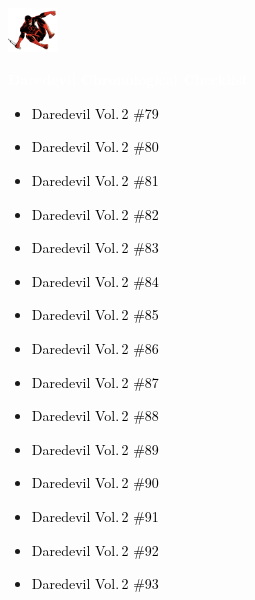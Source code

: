 \documentclass[12pt]{article}
\newcommand{\checkbox}{\raisebox{0.0ex}{\fbox{\rule{0ex}{1.5ex} \rule{1.5ex}{0ex}}}}
\begin{document}
\begin{center}
    \vspace*{2cm}
    \includegraphics[width=0.1\textwidth]{daredevil1.png}
    \vspace{0.3cm}

    {\Huge \textbf{\textcolor{white}{Daredevil Chronological Checklist}}}
\end{center}

\vspace{0.3cm}
\noindent
\begin{tcolorbox}[
  colback=white!95!gray,
  colframe=black,
  width=\textwidth,
  arc=4mm,
  auto outer arc,
  boxrule=0.8pt,
  left=8pt,right=8pt,top=8pt,bottom=8pt
]
\begin{itemize}[left=0pt,label={\checkbox}]
    \item \textcolor{black}{Daredevil Vol.\,2 \#79}
    \item \textcolor{black}{Daredevil Vol.\,2 \#80}
    \item \textcolor{black}{Daredevil Vol.\,2 \#81}
    \item \textcolor{black}{Daredevil Vol.\,2 \#82}
    \item \textcolor{black}{Daredevil Vol.\,2 \#83}
    \item \textcolor{black}{Daredevil Vol.\,2 \#84}
    \item \textcolor{black}{Daredevil Vol.\,2 \#85}
    \item \textcolor{black}{Daredevil Vol.\,2 \#86}
    \item \textcolor{black}{Daredevil Vol.\,2 \#87}
    \item \textcolor{black}{Daredevil Vol.\,2 \#88}
    \item \textcolor{black}{Daredevil Vol.\,2 \#89}
    \item \textcolor{black}{Daredevil Vol.\,2 \#90}
    \item \textcolor{black}{Daredevil Vol.\,2 \#91}
    \item \textcolor{black}{Daredevil Vol.\,2 \#92}
    \item \textcolor{black}{Daredevil Vol.\,2 \#93}
\end{itemize}
\end{tcolorbox}
\end{document}
